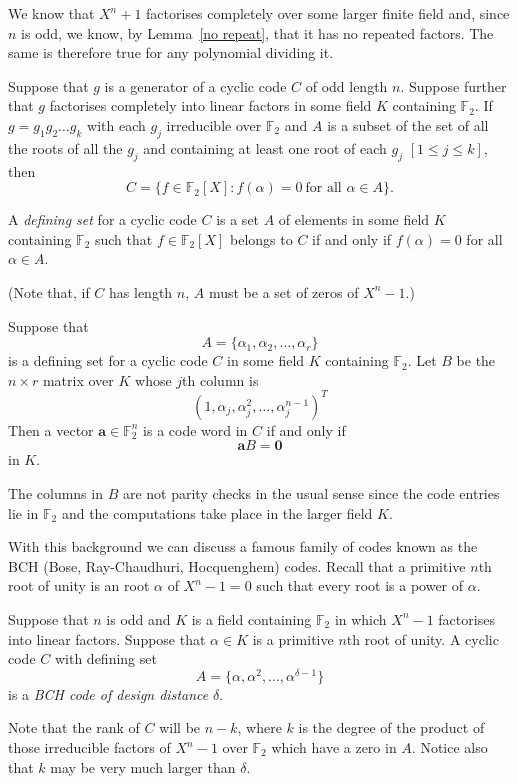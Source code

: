 We know that $X^{n}+1$ factorises completely
over some
larger finite field and, since $n$ is odd,
we know, by Lemma~\ref{no repeat},
that it has no
repeated factors. The same is therefore
true for any polynomial dividing it.
\begin{lemma} Suppose that $g$ is a
generator of a cyclic code $C$ of
odd length $n$. Suppose further
that $g$ factorises
completely into linear factors in some
field $K$ containing ${\mathbb F}_{2}$.
If $g=g_{1}g_{2}\dots g_{k}$ with each $g_{j}$ irreducible
over ${\mathbb F}_{2}$
and $A$ is a subset of the set of all the roots of
all the $g_{j}$ 
and containing at least one root
of each $g_{j}$ $[1\leq j\leq k]$,
then
\[C=\{f\in {\mathbb F}_{2}[X]:f(\alpha)=0 
\ \text{for all $\alpha\in A$}\}.\]
\end{lemma}
\begin{definition} A \emph{defining set} for a cyclic
code $C$ is a set $A$ of elements in some
field $K$ containing ${\mathbb F}_{2}$
such that $f\in{\mathbb F}_{2}[X]$ belongs
to $C$ if and only if $f(\alpha)=0$
for all $\alpha\in A$.
\end{definition}
\noindent
(Note that, if $C$ has length $n$,
$A$ must be a set of zeros
of $X^{n}-1$.)

\begin{lemma}\label{field check} Suppose that
\[A=\{\alpha_{1},\alpha_{2},\dots,\alpha_{r}\}\]
is a defining set for a cyclic
code $C$  in some
field $K$ containing ${\mathbb F}_{2}$.
Let $B$ be the $n\times r$ matrix over $K$
whose $j$th column is
\[(1,\alpha_{j},\alpha_{j}^{2},\dots,\alpha_{j}^{n-1})^{T}\]
Then a vector ${\mathbf a}\in{\mathbb F}_{2}^{n}$
is a code word in $C$ if and only if
\[{\mathbf a}B={\boldsymbol 0}\]
in $K$.
\end{lemma}
\noindent
The columns in $B$ are not parity checks in the usual
sense since the code entries lie in ${\mathbb F}_{2}$
and the computations take place in the larger field $K$.

With this background we can
discuss a famous family of codes known as
the BCH (Bose, Ray-Chaudhuri, Hocquenghem) codes.
Recall that a primitive $n$th root of unity is
an root $\alpha$ of $X^{n}-1=0$
such that every root is a power of $\alpha$.
\begin{definition}\label{definition BCH}
Suppose that $n$ is odd
and $K$ is a field containing
${\mathbb F}_{2}$ in which $X^{n}-1$ factorises into
linear factors. Suppose that
$\alpha\in K$ is a primitive
$n$th root of unity.
A cyclic code $C$ with defining set
\[A=\{\alpha,\alpha^{2},\dots,\alpha^{\delta-1}\}\]
is a \emph{BCH code of design distance} $\delta$.
\end{definition}
\noindent
Note that the rank of $C$ will be $n-k$, where $k$
is the degree of the product of
those irreducible factors
of $X^{n}-1$ over ${\mathbb F}_{2}$ which have a
zero in $A$. Notice also
that $k$ may be very much larger
than $\delta$.

